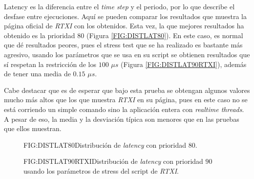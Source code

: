 
Latency es la diferencia entre el \textit{time step} y el periodo, por lo que describe el desfase entre ejecuciones. Aquí se pueden comparar los resultados que muestra la página oficial de \textit{RTXI} con los obtenidos. Esta vez, la que mejores resultados ha obtenido es la prioridad $80$ (Figura \ref{FIG:DISTLAT80}). En este caso, es normal que dé resultados peores, pues el stress test que se ha realizado es bastante más agresivo, usando los parámetros que se usa en su script se obtienen resultados que sí respetan la restricción de los $100$ $\mu s$ (Figura \ref{FIG:DISTLAT90RTXI}), además de tener una media de $0.15$ $\mu s$. 

Cabe destacar que es de esperar que bajo esta prueba se obtengan algunos valores mucho más altos que los que muestra \textit{RTXI} en su página, pues en este caso no se está corriendo un simple comando sino la aplicación entera con \textit{realtime threads}. A pesar de eso, la media y la desviación típica son menores que en las pruebas que ellos muestran. 

\begin{figure}[Distribución de latency con prioridad 80]{FIG:DISTLAT80}{Distribución de \textit{latency} con prioridad $80$.}
\end{figure}

\begin{figure}[Distribución de latency con prioridad 90]{FIG:DISTLAT90RTXI}{Distribución de \textit{latency} con prioridad $90$ usando los parámetros de stress del script de \textit{RTXI}.}
\end{figure}

